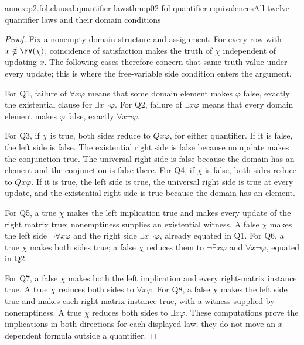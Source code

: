 \begin{annexitem}{annex:p2.fol.clausal.quantifier-laws}{thm:p02-fol-quantifier-equivalences}{All twelve quantifier laws and their domain conditions}
\begin{proof}
Fix a nonempty-domain structure and assignment.  For every row with
\(x\notin\FV(\chi)\), coincidence of satisfaction makes the truth
of \(\chi\) independent of updating \(x\).  The following cases
therefore concern that same truth value under every update; this is
where the free-variable side condition enters the argument.

For Q1, failure of \(\forall x\varphi\) means that some domain
element makes \(\varphi\) false, exactly the existential clause
for \(\exists x\neg\varphi\).  For Q2, failure of
\(\exists x\varphi\) means that every domain element makes
\(\varphi\) false, exactly \(\forall x\neg\varphi\).

For Q3, if \(\chi\) is true, both sides reduce to
\(Qx\varphi\), for either quantifier.  If it is false, the left
side is false.  The existential right side is false because no
update makes the conjunction true.  The universal right side is
false because the domain has an element and the conjunction is
false there.  For Q4, if \(\chi\) is false, both sides reduce
to \(Qx\varphi\).  If it is true, the left side is true, the
universal right side is true at every update, and the existential
right side is true because the domain has an element.

For Q5, a true \(\chi\) makes the left implication true and
makes every update of the right matrix true; nonemptiness supplies
an existential witness.  A false \(\chi\) makes the left side
\(\neg\forall x\varphi\) and the right side
\(\exists x\neg\varphi\), already equated in Q1.  For Q6,
a true \(\chi\) makes both sides true; a false \(\chi\)
reduces them to \(\neg\exists x\varphi\) and
\(\forall x\neg\varphi\), equated in Q2.

For Q7, a false \(\chi\) makes both the left implication and
every right-matrix instance true.  A true \(\chi\) reduces
both sides to \(\forall x\varphi\).  For Q8, a false
\(\chi\) makes the left side true and makes each right-matrix
instance true, with a witness supplied by nonemptiness.  A true
\(\chi\) reduces both sides to \(\exists x\varphi\).
These computations prove the implications in both directions for
each displayed law; they do not move an \(x\)-dependent formula
outside a quantifier.


\end{proof}
\end{annexitem}
